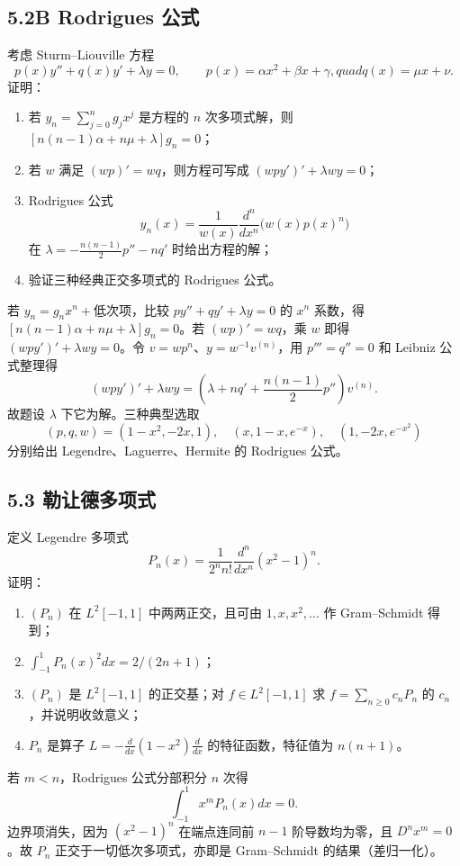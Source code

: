 \subsection*{5.2B Rodrigues 公式}
\begin{problem}
考虑 Sturm--Liouville 方程
\[
p(x)y''+q(x)y'+\lambda y=0,\qquad
p(x)=\alpha x^2+\beta x+\gamma,quad q(x)=\mu x+\nu.
\]
证明：
\begin{enumerate}[label=(\arabic*)]
\item 若 $y_n=\sum_{j=0}^ng_jx^j$ 是方程的 $n$ 次多项式解，则
$[n(n-1)\alpha+n\mu+\lambda]g_n=0$；
\item 若 $w$ 满足 $(wp)'=wq$，则方程可写成
$(wpy')'+\lambda wy=0$；
\item Rodrigues 公式
\[
y_n(x)=\frac1{w(x)}\frac{d^n}{dx^n}\bigl(w(x)p(x)^n\bigr)
\]
在 $\lambda=-\frac{n(n-1)}2p''-nq'$ 时给出方程的解；
\item 验证三种经典正交多项式的 Rodrigues 公式。
\end{enumerate}
\end{problem}
若 $y_n=g_nx^n+$低次项，比较 $py''+qy'+\lambda y=0$ 的 $x^n$ 系数，得
$[n(n-1)\alpha+n\mu+\lambda]g_n=0$。若 $(wp)'=wq$，乘 $w$ 即得
$(wpy')'+\lambda wy=0$。令 $v=wp^n$、$y=w^{-1}v^{(n)}$，用 $p'''=q''=0$ 和 Leibniz 公式整理得
\[
(wpy')'+\lambda wy=
\left(\lambda+nq'+\frac{n(n-1)}2p''\right)v^{(n)}.
\]
故题设 $\lambda$ 下它为解。三种典型选取
\[
(p,q,w)=(1-x^2,-2x,1),\quad(x,1-x,e^{-x}),\quad(1,-2x,e^{-x^2})
\]
分别给出 Legendre、Laguerre、Hermite 的 Rodrigues 公式。

\subsection*{5.3 勒让德多项式}
\begin{problem}
定义 Legendre 多项式
\[
P_n(x)=\frac1{2^nn!}\frac{d^n}{dx^n}(x^2-1)^n.
\]
证明：
\begin{enumerate}[label=(\arabic*)]
\item $(P_n)$ 在 $L^2[-1,1]$ 中两两正交，且可由 $1,x,x^2,\ldots$ 作 Gram--Schmidt 得到；
\item $\int_{-1}^1P_n(x)^2dx=2/(2n+1)$；
\item $(P_n)$ 是 $L^2[-1,1]$ 的正交基；对 $f\in L^2[-1,1]$ 求
$f=\sum_{n\ge0}c_nP_n$ 的 $c_n$，并说明收敛意义；
\item $P_n$ 是算子 $L=-\frac d{dx}(1-x^2)\frac d{dx}$ 的特征函数，特征值为 $n(n+1)$。
\end{enumerate}
\end{problem}
若 $m<n$，Rodrigues 公式分部积分 $n$ 次得
\[
\int_{-1}^1x^mP_n(x)dx=0.
\]
边界项消失，因为 $(x^2-1)^n$ 在端点连同前 $n-1$ 阶导数均为零，且 $D^nx^m=0$。故 $P_n$ 正交于一切低次多项式，亦即是 Gram--Schmidt 的结果（差归一化）。

